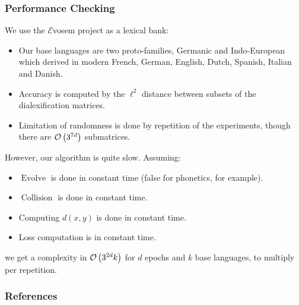 \documentclass[ratio=169]{beamercours}
\DeclareMathOperator{\revo}{Evolve}
\DeclareMathOperator{\coll}{Collision}
\begin{document}
\begin{frame}[allowframebreaks]
	\frametitle{Performance Checking}
	We use the $\mathcal{E}$vosem project \cite{evosem} as a lexical bank:
	\begin{itemize}
		\item Our base languages are two proto-families, Germanic and Indo-European which
derived in modern French, German, English, Dutch, Spanish, Italian and Danish.
		\item Accuracy is computed by the $\ell^{2}$ distance between subsets of the dialexification matrices.
		\item Limitation of randomness is done by repetition of the experiments, though there are $\mathcal{O}\left( 3^{7d} \right)$ submatrices.
	\end{itemize}

	\framebreak

	However, our algorithm is quite slow. Assuming:
	\begin{itemize}
		\item $\revo$ is done in constant time (false for phonetics, for example).
		\item $\coll$ is done in constant time.
		\item Computing $d\left( x, y \right)$ is done in constant time.
		\item Loss computation is in constant time.
	\end{itemize}
	we get a complexity in $\mathcal{O}\left( 3^{2d}k \right)$ for $d$ epochs and $k$ base languages, to multiply per repetition.
\end{frame}

\begin{frame}[t]
	\frametitle{References}
	
	
\end{frame}
\end{document}
